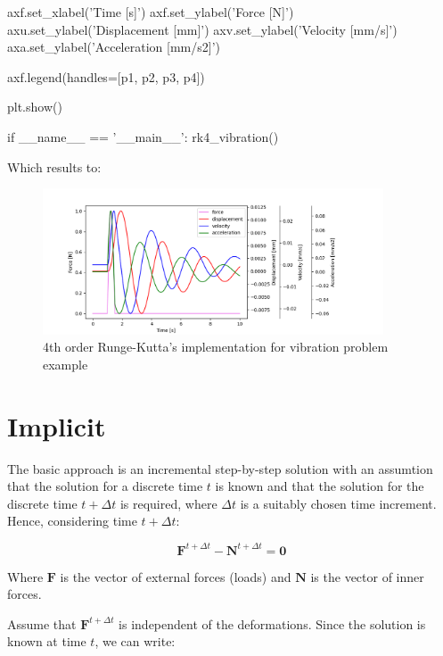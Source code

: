 \documentclass[10pt,b5paper,titlepage]{book}
\begin{document}
\begin{python}
    axf.set_xlabel('Time [s]')
    axf.set_ylabel('Force [N]')
    axu.set_ylabel('Displacement [mm]')
    axv.set_ylabel('Velocity [mm/s]')
    axa.set_ylabel('Acceleration [mm/s2]')

    axf.legend(handles=[p1, p2, p3, p4])

    plt.show()

if __name__ == '__main__':
    rk4_vibration()

\end{python}

Which results to:
\begin{figure}[ht]
    \centering
    \includegraphics[width=0.90\textwidth]{img/rk4_example.png}
    \caption{4th order Runge-Kutta's implementation for vibration problem example}
    \label{fig:rk4-example-png}
\end{figure}



\newpage
\section{Implicit}

The basic approach is an incremental step-by-step solution with an assumtion
that the solution for a discrete time $ t $ is known and that the solution for
the discrete time $ t + \Delta t $ is required, where $ \Delta t $ is
a suitably chosen time increment. Hence, considering time $ t + \Delta t $:

\begin{equation}\label{implicit-equation}
    \mathbf{F}^{t + \Delta t} - \mathbf{N}^{t + \Delta t} = \mathbf{0}
\end{equation}

Where $ \mathbf{F} $ is the vector of external forces (loads) and $ \mathbf{N} $
is the vector of inner forces.

Assume that $ \mathbf{F}^{t + \Delta t} $ is independent of the deformations.
Since the solution is known at time $ t $, we can write:
\end{document}
